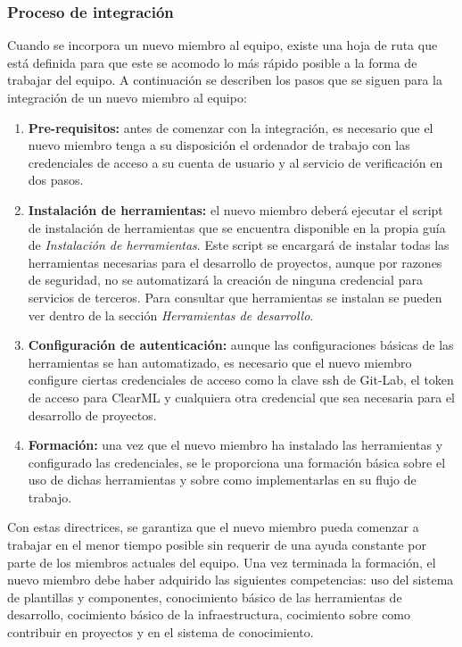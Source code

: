 \subsubsection{Proceso de integración}
Cuando se incorpora un nuevo miembro al equipo, existe una hoja de ruta que está
definida para que este se acomodo lo más rápido posible a la forma de trabajar del
equipo. A continuación se describen los pasos que se siguen para la integración de
un nuevo miembro al equipo:
\begin{enumerate}
    \item \textbf{Pre-requisitos:} antes de comenzar con la integración, es necesario
    que el nuevo miembro tenga a su disposición el ordenador de trabajo con las
    credenciales de acceso a su cuenta de usuario y al servicio de verificación en
    dos pasos.
    \item \textbf{Instalación de herramientas:} el nuevo miembro deberá ejecutar el
    script de instalación de herramientas que se encuentra disponible en la propia
    guía de \textit{Instalación de herramientas}. Este script se encargará de instalar
    todas las herramientas necesarias para el desarrollo de proyectos, aunque por
    razones de seguridad, no se automatizará la creación de ninguna credencial para
    servicios de terceros. Para consultar que herramientas se instalan se pueden ver
    dentro de la sección \textit{Herramientas de desarrollo}.
    \item \textbf{Configuración de autenticación:} aunque las configuraciones básicas
    de las herramientas se han automatizado, es necesario que el nuevo miembro configure
    ciertas credenciales de acceso como la clave ssh de Git-Lab, el token de acceso para ClearML
    y cualquiera otra credencial que sea necesaria para el desarrollo de proyectos.
    \item \textbf{Formación:} una vez que el nuevo miembro ha instalado las herramientas
    y configurado las credenciales, se le proporciona una formación básica sobre el uso
    de dichas herramientas y sobre como implementarlas en su flujo de trabajo.
\end{enumerate}

Con estas directrices, se garantiza que el nuevo miembro pueda comenzar a trabajar
en el menor tiempo posible sin requerir de una ayuda constante por parte de los
miembros actuales del equipo. Una vez terminada la formación, el nuevo miembro
debe haber adquirido las siguientes competencias: uso del sistema de plantillas y componentes,
conocimiento básico de las herramientas de desarrollo, cocimiento básico de la infraestructura,
cocimiento sobre como contribuir en proyectos y en el sistema de conocimiento.

